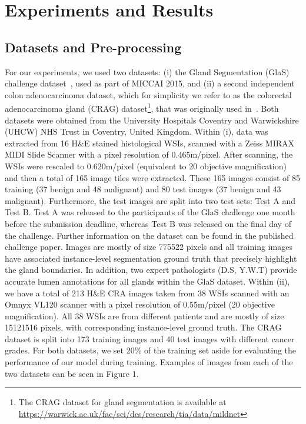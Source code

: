 \documentclass[3p]{elsarticle}
\begin{document}
\section{Experiments and Results}
\subsection{Datasets and Pre-processing}
For our experiments, we used two datasets: (i) the Gland Segmentation (GlaS) challenge dataset~\citep{sirinukunwattana2017gland}, used as part of MICCAI 2015, and (ii) a second independent colon adenocarcinoma dataset, which for simplicity we refer to as the colorectal adenocarcinoma gland (CRAG) dataset\footnote{The CRAG dataset for gland segmentation is available at \url{https://warwick.ac.uk/fac/sci/dcs/research/tia/data/mildnet}}, that was originally used in~\cite{awan2017glandular}. Both datasets were obtained from the University Hospitals Coventry and Warwickshire (UHCW) NHS Trust in Coventry, United Kingdom. Within (i), data was extracted from 16 H\&E stained histological WSIs, scanned with a Zeiss MIRAX MIDI Slide Scanner with a pixel resolution of 0.465m/pixel. After scanning, the WSIs were rescaled to 0.620m/pixel (equivalent to 20 objective magnification) and then a total of 165 image tiles were extracted. These 165 images consist of 85 training (37 benign and 48 malignant) and 80 test images (37 benign and 43 malignant). Furthermore, the test images are split into two test sets: Test A and Test B. Test A was released to the participants of the GlaS challenge one month before the submission deadline, whereas Test B was released on the final day of the challenge. Further information on the dataset can be found in the published challenge paper\citep{sirinukunwattana2017gland}. Images are mostly of size 775522 pixels and all training images have associated instance-level segmentation ground truth that precisely highlight the gland boundaries. In addition, two expert pathologists (D.S, Y.W.T) provide accurate lumen annotations for all glands within the GlaS dataset. Within (ii), we have a total of 213 H\&E CRA images taken from 38 WSIs scanned with an Omnyx VL120 scanner with a pixel resolution of 0.55m/pixel (20 objective magnification). All 38 WSIs are from different patients and are mostly of size 15121516 pixels, with corresponding instance-level ground truth. The CRAG dataset is split into 173 training images and 40 test images with different cancer grades. For both datasets, we set 20\% of the training set aside for evaluating the performance of our model during training. Examples of images from each of the two datasets can be seen in Figure 1.
\end{document}

